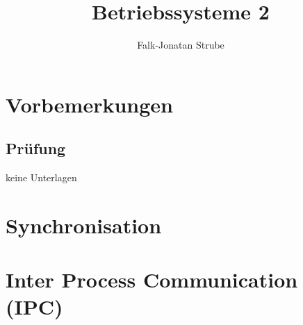 \documentclass{scrreprt}
\title{Betriebssysteme 2}
\author{Falk-Jonatan Strube}
\begin{document}
\maketitle
\newpage
\tableofcontents
\newpage

\chapter*{Vorbemerkungen}

\section*{Prüfung}
keine Unterlagen

\chapter{Synchronisation}


\chapter{Inter Process Communication (IPC)}





\end{document}

